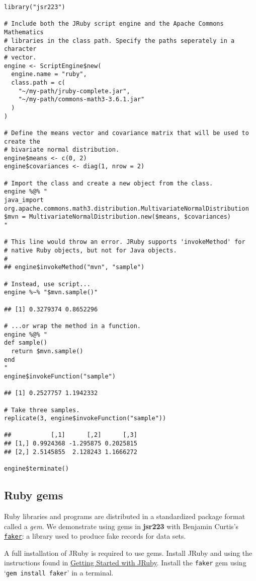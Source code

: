 \documentclass[
article,
11pt, %
a4paper, %
oneside, %
headinclude,footinclude, %
]{scrartcl}
\theoremstyle{definition} %
\theoremstyle{plain} %
\theoremstyle{remark} %
\newcommand{\pkg}[1]{\textbf{#1}}
\newcommand{\code}[1]{\texttt{#1}}
\newcommand{\samp}[1]{{`\normalfont\texttt{#1}'}}
\begin{document}
\begin{verbatim}
library("jsr223")

# Include both the JRuby script engine and the Apache Commons Mathematics
# libraries in the class path. Specify the paths seperately in a character
# vector.
engine <- ScriptEngine$new(
  engine.name = "ruby",
  class.path = c(
    "~/my-path/jruby-complete.jar",
    "~/my-path/commons-math3-3.6.1.jar"
  )
)

# Define the means vector and covariance matrix that will be used to create the
# bivariate normal distribution.
engine$means <- c(0, 2)
engine$covariances <- diag(1, nrow = 2)

# Import the class and create a new object from the class.
engine %@% "
java_import org.apache.commons.math3.distribution.MultivariateNormalDistribution
$mvn = MultivariateNormalDistribution.new($means, $covariances)
"

# This line would throw an error. JRuby supports 'invokeMethod' for
# native Ruby objects, but not for Java objects.
#
## engine$invokeMethod("mvn", "sample")

# Instead, use script...
engine %~% "$mvn.sample()"

## [1] 0.3279374 0.8652296

# ...or wrap the method in a function.
engine %@% "
def sample()
  return $mvn.sample()
end
"
engine$invokeFunction("sample")

## [1] 0.2527757 1.1942332

# Take three samples.
replicate(3, engine$invokeFunction("sample"))

##           [,1]      [,2]      [,3]
## [1,] 0.9924368 -1.295875 0.2025815
## [2,] 2.5145855  2.128243 1.1666272

engine$terminate()
\end{verbatim}

\subsection{Ruby gems}

Ruby libraries and programs are distributed in a standardized package format called a \textit{gem}. We demonstrate using gems in \pkg{jsr223} with Benjamin Curtis's \href{https://github.com/stympy/faker}{\code{faker}}: a library used to produce fake records for data sets. %

A full installation of JRuby is required to use gems. Install JRuby and using the instructions found in \href{https://github.com/jruby/jruby/wiki/GettingStarted}{Getting Started with JRuby}. %
Install the \code{faker} gem using \samp{gem install faker} in a terminal.
\end{document}
